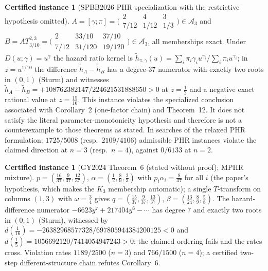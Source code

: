 \documentclass[10pt]{article}
\theoremstyle{plain}
\theoremstyle{definition}
\newtheorem{certificate}[theorem]{Certified instance}
\theoremstyle{remark}
\begin{document}
\begin{certificate}[SPBB2026 PHR specialization with the restrictive hypothesis omitted]\label{cer:spbb}
$A=[\gamma;\pi]=\bigl(\begin{smallmatrix}2&4&3\\ 7/12&1/12&1/3\end{smallmatrix}\bigr)\in\mathcal A_3$ and $B=AT^{2,3}_{3/10}=\bigl(\begin{smallmatrix}2&33/10&37/10\\ 7/12&31/120&19/120\end{smallmatrix}\bigr)\in\mathcal A_3$, all memberships exact. Under $D(u;\gamma)=u^\gamma$ the hazard ratio kernel is $\tilde h_{\pi,\gamma}(u)=\sum_i\pi_i\gamma_iu^{\gamma_i}/\sum_i\pi_iu^{\gamma_i}$; in $z=u^{1/10}$ the difference $\tilde h_A-\tilde h_B$ has a degree-$37$ numerator with exactly two roots in $(0,1)$ (Sturm) and witnesses $\tilde h_A-\tilde h_B=+108762382147/224621531888650>0$ at $z=\tfrac12$ and a negative exact rational value at $z=\tfrac{15}{16}$. This instance violates the specialized conclusion associated with Corollary~2 (one-factor chain) and Theorem~12. It does not satisfy the literal parameter-monotonicity hypothesis and therefore is not a counterexample to those theorems as stated. In searches of the relaxed PHR formulation: $1725/5008$ (resp.\ $2109/4106$) admissible PHR instances violate the claimed direction at $n=3$ (resp.\ $n=4$), against $0/6133$ at $n=2$.
\end{certificate}

\begin{certificate}[GY2024 Theorem~6 (stated without proof); MPHR mixture]\label{cer:gy}
$p=(\tfrac{16}{37},\tfrac9{37},\tfrac{12}{37})$, $\alpha=(\tfrac12,\tfrac89,\tfrac23)$ with $p_i\alpha_i=\tfrac8{37}$ for all $i$ (the paper's hypothesis, which makes the $K_3$ membership automatic); a single $T$-transform on columns $(1,3)$ with $\omega=\tfrac34$ gives $q=(\tfrac{15}{37},\tfrac9{37},\tfrac{13}{37})$, $\beta=(\tfrac{13}{24},\tfrac89,\tfrac58)$. The hazard-difference numerator $-6623y^7+217404y^6-\cdots$ has degree $7$ and exactly two roots in $(0,1)$ (Sturm), witnessed by $d(\tfrac1{16})=-26382968577328/697805944384200125<0$ and $d(\tfrac15)=1056692120/7414054947243>0$: the claimed ordering fails and the rates cross. Violation rates $1189/2500$ ($n=3$) and $766/1500$ ($n=4$); a certified two-step different-structure chain refutes Corollary~6.
\end{certificate}
\end{document}
